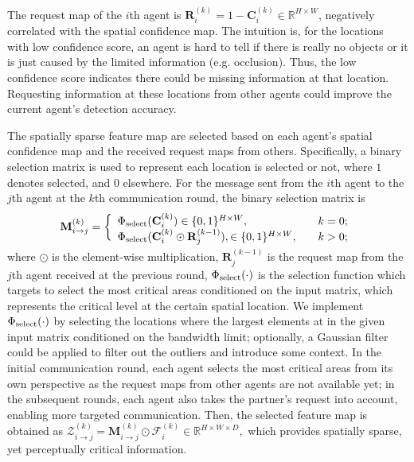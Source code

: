 The request map of the $i$th agent is $\mathbf{R}_{i}^{(k)} = 1 - \mathbf{C}_{i}^{(k)} \in \mathbb{R}^{H\times W}$, negatively correlated with the spatial confidence map. The intuition is, for the locations with low confidence score, an agent is hard to tell if there is really no objects or it is just caused by the limited information (e.g. occlusion). Thus, the low confidence score indicates there could be missing information at that location. Requesting information at these locations from other agents could improve the current agent's detection accuracy.

The spatially sparse feature map are selected based on each agent's spatial confidence map and the received request maps from others. Specifically, a binary selection matrix is used to represent each location is selected or not, where $1$ denotes selected, and $0$ elsewhere. For the message sent from the $i$th agent to the $j$th agent at the $k$th communication round, the binary selection matrix is
\begin{equation}
\vspace{-1mm}
\label{eq:selector}
\mathbf{M}_{i\rightarrow j}^{(k)}=\left\{
\begin{array}{lll}
\Phi_{\rm select}(\mathbf{C}_{i}^{(k)})\in \{0, 1\}^{H\times W}, &\quad k=0;\\
\Phi_{\rm select}(\mathbf{C}_{i}^{(k)}\odot \mathbf{R}_j^{(k-1)} ), \in \{0, 1\}^{H\times W},  &\quad k>0;
\vspace{-1mm}
\end{array} \right.
\end{equation}
where $\odot$ is the element-wise multiplication, $\mathbf{R}_j^{(k-1)}$ is the request map from the $j$th agent received at the previous round, $\Phi_{\rm select}(\cdot)$ is the selection function which targets to select the most critical areas conditioned on the input matrix, which represents the critical level at the certain spatial location. We implement $\Phi_{\rm select}(\cdot)$ by selecting the locations where the largest elements at in the given input matrix conditioned on the bandwidth limit; optionally, a Gaussian filter could be applied to filter out the outliers and introduce some context. In the initial communication round, each agent selects the most critical areas from its own perspective as the request maps from other agents are not available yet; in the subsequent rounds, each agent also takes the partner's request into account, enabling more targeted communication. Then, the selected feature map is obtained as
$
    \mathcal{Z}_{i\rightarrow j}^{(k)}=\mathbf{M}_{i\rightarrow j}^{(k)}\odot \mathcal{F}_i^{(k)} \in \mathbb{R}^{H\times W \times D},
$
which provides spatially sparse, yet perceptually critical information. 

